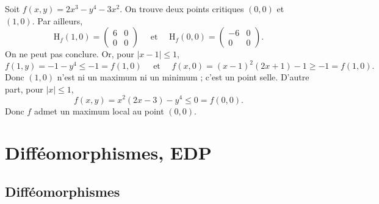 \documentclass[class=report,crop=false]{standalone}
\begin{document}
\vskip6mm

Soit $f(x,y)=2x^3-y^4-3x^2$. On trouve deux points critiques $(0,0)$ et $(1,0)$. Par ailleurs,
$$\mbox{H}_f(1,0)=\left(\begin{array}{cc}6&0\\ 0&0\end{array}\right)\quad \mbox{ et }\quad \mbox{H}_f(0,0)=\left(\begin{array}{cc}-6&0\\ 0&0\end{array}\right).$$
On ne peut pas conclure. Or, pour $|x-1|\leq 1$,
$$f(1,y)=-1-y^4\leq -1=f(1,0)\quad \mbox{ et }\quad f(x,0)=(x-1)^2(2x+1)-1\geq -1=f(1,0).$$
Donc $(1,0)$ n'est ni un maximum ni un minimum ; c'est un point selle. D'autre part, pour $|x|\leq 1$,
$$f(x,y)=x^2(2x-3)-y^4\leq 0=f(0,0).$$
Donc $f$ admet un maximum local au point $(0,0)$.

%
%
%
%


\chapter{\bf Difféomorphismes, EDP}
\section{Difféomorphismes}
\end{document}
